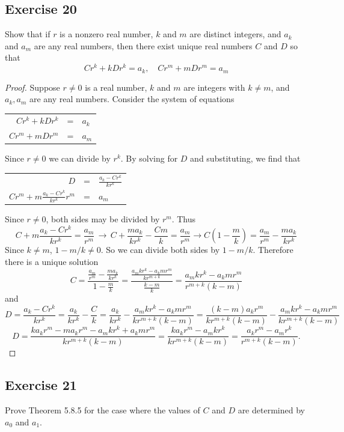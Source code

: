 \documentclass[14pt]{extarticle}
\newcommand{\dps}{\displaystyle}
\begin{document}
\subsection{Exercise 20}
Show that if $r$ is a nonzero real number, $k$ and $m$ are distinct integers, and $a_k$ and $a_m$ are any real 
numbers, then there exist unique real numbers $C$ and $D$ so that
\[
Cr^k + kDr^k = a_k, \,\,\,\,\,\, Cr^m + mDr^m = a_m
\]
\begin{proof}
Suppose \(r \neq 0\) is a real number, $k$ and $m$ are integers with \(k \neq m\), and $a_k, a_m$ are any real numbers. 
Consider the system of equations
\begin{center}
\begin{tabular}{rcl}
\(Cr^k + kDr^k\) & = & \(a_k\) \\
\(Cr^m + mDr^m\) & = & \(a_m\)
\end{tabular}
\end{center}
Since $r \neq 0$ we can divide by $r^k$. By solving for $D$ and substituting, we find that
\begin{center}
\begin{tabular}{rcl}
\(D\) & = & \(\dps \frac{a_k - Cr^k}{kr^k}\) \\
\(\dps Cr^m + m \frac{a_k - Cr^k}{kr^k} r^m\) & = & \(a_m\)
\end{tabular}
\end{center}
Since \(r \neq 0\), both sides may be divided by $r^m$. 
Thus
\[
C + m \frac{a_k - Cr^k}{kr^k} = \frac{a_m}{r^m} \, \to \, 
C + \frac{ma_k}{kr^k} - \frac{Cm}{k} = \frac{a_m}{r^m} \to
C\left(1 - \frac{m}{k}\right) = \frac{a_m}{r^m} - \frac{ma_k}{kr^k}
\]
Since $k \neq m$, $1 - m/k \neq 0$. So we can divide both sides by $1 - m/k$. Therefore there is a unique solution
\[
C = \frac{\dps \frac{a_m}{r^m} - \frac{ma_k}{kr^k}}{\dps 1 - \frac{m}{k}}
= \frac{\dps \frac{a_m kr^k - a_k mr^m}{kr^{m+k}}}{\dps \frac{k - m}{k}}
= \frac{a_m kr^k - a_k mr^m}{r^{m+k}(k-m)}
\]
and
\[
D = \frac{a_k - Cr^k}{kr^k} = \frac{a_k}{kr^k} - \frac{C}{k} 
= \frac{a_k}{kr^k} - \frac{a_m kr^k - a_k mr^m}{kr^{m+k}(k-m)}
= \frac{(k-m)a_k r^m}{kr^{m+k}(k-m)} - \frac{a_m kr^k - a_k mr^m}{kr^{m+k}(k-m)}
\]
\[
D = \frac{ka_k r^m - ma_k r^m - a_m kr^k + a_k mr^m}{kr^{m+k}(k-m)}
= \frac{ka_k r^m - a_m kr^k}{kr^{m+k}(k-m)}
= \frac{a_k r^m - a_m r^k}{r^{m+k}(k-m)}.
\]
\end{proof}

\subsection{Exercise 21}
Prove Theorem 5.8.5 for the case where the values of $C$ and $D$ are determined by $a_0$ and $a_1$.
\end{document}
